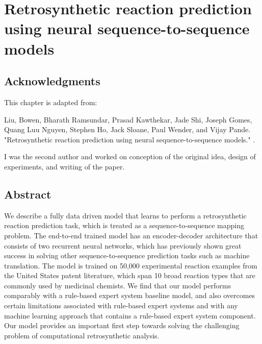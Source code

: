 \section{Retrosynthetic reaction prediction using neural sequence-to-sequence models}

\subsection{Acknowledgments}

This chapter is adapted from: 

Liu, Bowen, Bharath Ramsundar, Prasad Kawthekar, Jade Shi, Joseph Gomes, Quang Luu Nguyen, Stephen Ho, Jack Sloane, Paul Wender, and Vijay Pande. "Retrosynthetic reaction prediction using neural sequence-to-sequence models." \cite{liu2017retrosynthetic}. 

I was the second author and worked on conception of the original idea, design of experiments, and writing of the paper.


\subsection{Abstract}
We describe a fully data driven model that learns to perform a retrosynthetic reaction prediction task, which is treated as a sequence-to-sequence mapping problem. The end-to-end trained model has an encoder-decoder architecture that consists of two recurrent neural networks, which has previously shown great success in solving other sequence-to-sequence prediction tasks such as machine translation. The model is trained on 50,000 experimental reaction examples from the United States patent literature, which span 10 broad reaction types that are commonly used by medicinal chemists. We find that our model performs comparably with a rule-based expert system baseline model, and also overcomes certain limitations associated with rule-based expert systems and with any machine learning approach that contains a rule-based expert system component. Our model provides an important first step towards solving the challenging problem of computational retrosynthetic analysis. 

